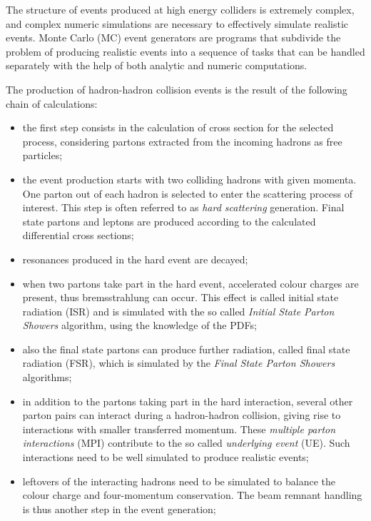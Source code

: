 The structure of events produced at high energy colliders is extremely complex, and complex numeric simulations are necessary to effectively simulate realistic events. Monte Carlo (MC) event generators are programs that subdivide the problem of producing realistic events into a sequence of tasks that can be handled separately with the help of both analytic and numeric computations.

The production of hadron-hadron collision events is the result of the following chain of calculations:

\begin{itemize}
\item the first step consists in the calculation of cross section for the selected process, considering partons extracted from the incoming hadrons as free particles;

\item the event production starts with two colliding hadrons with given momenta. One parton out of each hadron is selected to enter the scattering process of interest. This step is often referred to as \emph{hard scattering} generation. Final state partons and leptons are produced according to the calculated differential cross sections;

\item resonances produced in the hard event are decayed;

\item when two partons take part in the hard event, accelerated colour charges are present, thus bremsstrahlung can occur. This effect is called initial state radiation (ISR) and is simulated with the so called \emph{Initial State Parton Showers} algorithm, using the knowledge of the PDFs;

\item also the final state partons can produce further radiation, called final state radiation (FSR), which is simulated by the \emph{Final State Parton Showers} algorithms;

\item in addition to the partons taking part in the hard interaction, several other parton pairs can interact during a hadron-hadron collision, giving rise to interactions with smaller transferred momentum. These \emph{multiple parton interactions} (MPI) contribute to the so called \emph{underlying event} (UE). Such interactions need to be well simulated to produce realistic events;

\item leftovers of the interacting hadrons need to be simulated to balance the colour charge
and four-momentum conservation. The beam remnant handling is thus another step in the event generation;


\end{itemize}
